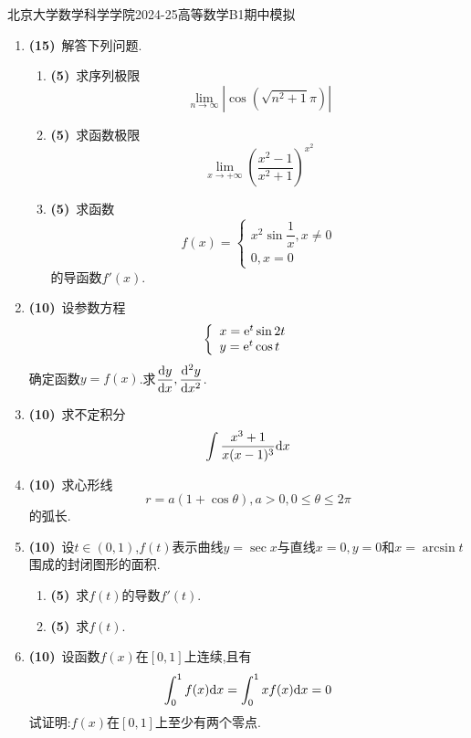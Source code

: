 \documentclass{ctexart}
\begin{document}
\pagestyle{empty}
\begin{center}\Large
    北京大学数学科学学院2024-25高等数学B1期中模拟
\end{center}
\begin{enumerate}[leftmargin=*,label=\textbf{\arabic*.},topsep=0pt,parsep=0pt,itemsep=0pt,partopsep=0pt]
    \item \textbf{(15)}\ 解答下列问题.
    \begin{enumerate}[label=\textbf{(\arabic*)}]
        \item \textbf{(5)}\ 求序列极限$$\lim_{n\to\infty}\left|\cos\left(\sqrt{n^2+1}\pi\right)\right|$$
        \item \textbf{(5)}\ 求函数极限$$\lim_{x\to+\infty}\left(\dfrac{x^2-1}{x^2+1}\right)^{x^2}$$
        \item \textbf{(5)}\ 求函数$$f(x)=\left\{\begin{array}{l}x^2\sin\dfrac{1}{x},x\neq 0\\0,x=0\end{array}\right.$$的导函数$f'(x)$.
    \end{enumerate}

    \item \textbf{(10)}\ 设参数方程$$\left\{\begin{array}{l}x=\mathrm{e}^t\sin2t\\y=\mathrm{e}^t\cos t\end{array}\right.$$确定函数$y=f(x)$.求$\dfrac{\mathrm{d} y}{\mathrm{d} x},\dfrac{\mathrm{d}^2y}{\mathrm{d} x^2}$.

    \item \textbf{(10)}\ 求不定积分$$\int\dfrac{x^3+1}{x(x-1)^3}\mathrm{d} x$$

    \item \textbf{(10)}\ 求心形线$$r=a(1+\cos\theta),a>0,0\leqslant\theta\leqslant2\pi$$的弧长.

    \item \textbf{(10)}\ 设$t\in(0,1)$,$f(t)$表示曲线$y=\sec x$与直线$x=0,y=0$和$x=\arcsin t$围成的封闭图形的面积.
    \begin{enumerate}[label=\textbf{(\arabic*)}]
        \item \textbf{(5)}\ 求$f(t)$的导数$f'(t)$.
        \item \textbf{(5)}\ 求$f(t)$.
    \end{enumerate}

    \item \textbf{(10)}\ 设函数$f(x)$在$[0,1]$上连续,且有$$\int_0^1f(x)\mathrm{d} x=\int_0^1xf(x)\mathrm{d} x=0$$试证明:$f(x)$在$[0,1]$上至少有两个零点.


\end{enumerate}
\end{document}
